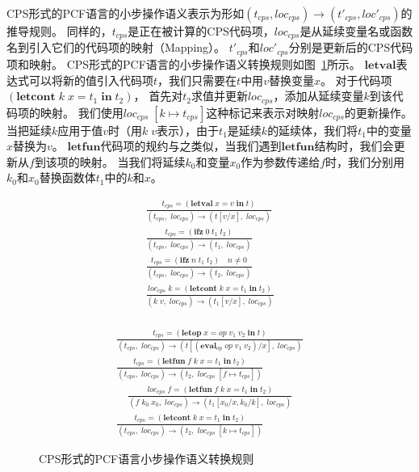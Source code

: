 CPS形式的PCF语言的小步操作语义表示为形如$(t_{cps},loc_{cps})\rightarrow(t'_{cps},loc'_{cps})$的推导规则。
同样的，$t_{cps}$是正在被计算的CPS代码项，$loc_{cps}$是从延续变量名或函数名到引入它们的代码项的映射（Mapping）。
$t'_{cps}$和$loc'_{cps}$分别是更新后的CPS代码项和映射。
CPS形式的PCF语言的小步操作语义转换规则如图~\ref{cpsopsem}所示。
$\mathbf{letval}$表达式可以将新的值引入代码项$t$，我们只需要在$t$中用$v$替换变量$x$。
对于代码项$(\mathbf{letcont}\; k\; x=t_1\; \mathbf{in}\; t_2)$，
首先对$t_2$求值并更新$loc_{cps}$，添加从延续变量$k$到该代码项的映射。
我们使用$loc_{cps}\; [k\mapsto t_{cps}]$这种标记来表示对映射$loc_{cps}$的更新操作。
当把延续$k$应用于值$v$时（用$k\; v$表示），由于$t_1$是延续$k$的延续体，我们将$t_1$中的变量$x$替换为$v$。
$\mathbf{letfun}$代码项的规约与之类似，当我们遇到$\mathbf{letfun}$结构时，我们会更新从$f$到该项的映射。
当我们将延续$k_0$和变量$x_0$作为参数传递给$f$时，我们分别用$k_0$和$x_0$替换函数体$t_1$中的$k$和$x$。

\begin{figure}[htbp]
    \centering
    \begin{subfigure}[t]{0.43\textwidth}
        \begin{gather*}
            \displaystyle{\frac{t_{cps}=(\mathbf{letval}\; x=v\; \mathbf{in}\; t)} {(t_{cps},\; loc_{cps})\rightarrow (t [v/x],\; loc_{cps})}} \\
            \displaystyle{\frac{t_{cps}=(\mathbf{ifz}\; 0\; t_1\; t_2)} {(t_{cps},\; loc_{cps})\rightarrow (t_1,\; loc_{cps})}} \\
            \displaystyle{\frac{t_{cps}=(\mathbf{ifz}\; n\; t_1\; t_2)\quad n \neq 0} {(t_{cps},\; loc_{cps})\rightarrow (t_2,\; loc_{cps})}} \\
            \displaystyle{\frac{loc_{cps}\; k = (\mathbf{letcont}\; k\; x=t_1\; \mathbf{in}\; t_2)}{(k\; v,\; loc_{cps})\rightarrow (t_1 [v/x],\; loc_{cps})}} \\
        \end{gather*}
    \end{subfigure}
    \begin{subfigure}[t]{0.55\textwidth}
        \begin{gather*}
            \displaystyle{\frac{t_{cps}=(\mathbf{letop}\; x=op\; v_1\; v_2\; \mathbf{in}\; t)}
            {(t_{cps},\; loc_{cps})\rightarrow (t [(\mathbf{eval}_{op}\; op\; v_1\; v_2)/x],\; loc_{cps})}} \\
            \displaystyle{\frac{t_{cps}=(\mathbf{letfun}\; f\; k\; x=t_1\; \mathbf{in}\; t_2)} {(t_{cps},\; loc_{cps})\rightarrow (t_2,\; loc_{cps}\; [f\mapsto t_{cps}])}} \\
            \quad \displaystyle{\frac{loc_{cps}\; f = (\mathbf{letfun}\; f\; k\; x=t_1\; \mathbf{in}\; t_2)}{(f\; k_0\; x_0,\; loc_{cps})\rightarrow (t_1 [x_0/x, k_0/k],\; loc_{cps})}} \\
            \displaystyle{\frac{t_{cps}=(\mathbf{letcont}\; k\; x=t_1\; \mathbf{in}\; t_2)} {(t_{cps},\; loc_{cps})\rightarrow (t_2,\; loc_{cps}\; [k\mapsto t_{cps}])}} 
        \end{gather*}
    \end{subfigure}   
    \caption{CPS形式的PCF语言小步操作语义转换规则}\label{cpsopsem}
\end{figure}

